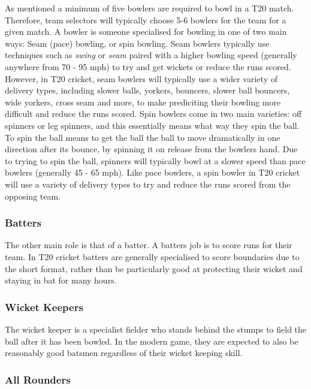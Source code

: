 \documentclass[12pt,a4paper]{report}
\theoremstyle{definition}
\begin{document}
As mentioned a minimum of five bowlers are required to bowl in a T20 match.  
Therefore, team selectors will typically choose 5-6 bowlers for the team for a given match.
A bowler is someone specialised for bowling in one of two main ways: Seam (pace) bowling, or spin bowling.
Seam bowlers typically use techniques such as \emph{swing} or \emph{seam} paired with a higher bowling speed (generally anywhere from 70 - 95 mph) to try and get wickets or reduce the runs scored.
However, in T20 cricket, seam bowlers will typically use a wider variety of delivery types, including slower balls, yorkers, bouncers, slower ball bouncers, wide yorkers, cross seam and more, to make prediciting their bowling more difficult and reduce the runs scored. 
Spin bowlers come in two main varieties: off spinners or leg spinners, and this essentially means what way they spin the ball. 
To spin the ball means to get the ball the ball to move dramatically in one direction after its bounce, by spinning it on release from the bowlers hand.
Due to trying to spin the ball, spinners will typically bowl at a slower speed than pace bowlers (generally 45 - 65 mph).
Like pace bowlers, a spin bowler in T20 cricket will use a variety of delivery types to try and reduce the runs scored from the opposing team.

\subsubsection{Batters}

The other main role is that of a batter.
A batters job is to score runs for their team.
In T20 cricket batters are generally specialised to score boundaries due to the short format, rather than be particularly good at protecting their wicket and staying in bat for many hours.

\subsubsection{Wicket Keepers}

The wicket keeper is a specialist fielder who stands behind the stumps to field the ball after it has been bowled.
In the modern game, they are expected to also be reasonably good batsmen regardless of their wicket keeping skill.

\subsubsection{All Rounders}
\end{document}
